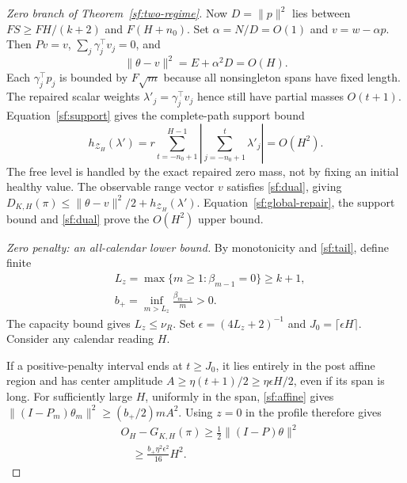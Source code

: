 \documentclass[journal]{IEEEtran}
\begin{document}
\begin{proof}[Zero branch of Theorem~\ref{sf:two-regime}]
Now $D=\|p\|^2$ lies between $FS\ge FH/(k+2)$ and $F(H+n_0)$.
Set $\alpha=N/D=O(1)$ and $v=w-\alpha p$.
Then $Pv=v$, $\sum_j\gamma_j^\top v_j=0$, and
\begin{equation}\label{sf:global-repair}
\|\theta-v\|^2=E+\alpha^2D=O(H).
\end{equation}
Each $\gamma_j^\top p_j$ is bounded by $F\sqrt m$ because
all nonsingleton spans have fixed length. The repaired scalar weights
$\lambda'_j=\gamma_j^\top v_j$ hence still have partial masses $O(t+1)$.
Equation~\eqref{sf:support} gives the complete-path support bound
\begin{equation}\label{sf:zero-support}
h_{\mathcal Z_H}(\lambda')=
r\sum_{t=-n_0+1}^{H-1}
 \left|\sum_{j=-n_0+1}^t\lambda'_j\right|=O(H^2).
\end{equation}
The free level is handled by the exact repaired zero mass, not by fixing
an initial healthy value.
The observable range vector $v$ satisfies \eqref{sf:dual}, giving
$D_{K,H}(\pi)\le\|\theta-v\|^2/2+h_{\mathcal Z_H}(\lambda')$.
Equation~\eqref{sf:global-repair}, the support bound and \eqref{sf:dual}
prove the $O(H^2)$ upper bound.

\par\smallskip\noindent\textit{Zero penalty: an all-calendar lower bound.}\enspace 
By monotonicity and \eqref{sf:tail}, define finite
\[
\begin{aligned}
&L_z=\max\{m\ge1:\beta_{m-1}=0\}\ge k+1,\\
&b_+=\inf_{m>L_z}\frac{\beta_{m-1}}m>0 .
\end{aligned}
\]
The capacity bound gives $L_z\le\nu_R$.
Set $\epsilon=(4L_z+2)^{-1}$ and $J_0=\lceil\epsilon H\rceil$.
Consider any calendar reading $H$.

If a positive-penalty interval ends at $t\ge J_0$, it lies entirely
in the post affine region and has center amplitude
$A\ge\eta(t+1)/2\ge\eta\epsilon H/2$, even if its span is long.
For sufficiently large $H$, uniformly in the span,
\eqref{sf:affine} gives
$\|(I-P_m)\theta_m\|^2\ge(b_+/2)mA^2$.
Using $z=0$ in the profile therefore gives
\begin{equation}\label{sf:zero-positive-case}
\begin{aligned}
&O_H-G_{K,H}(\pi)\ge\tfrac12\|(I-P)\theta\|^2\\
&\quad\ge \frac{b_+\eta^2\epsilon^2}{16}H^2 .
\end{aligned}
\end{equation}


\end{proof}
\end{document}
